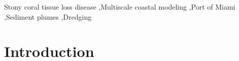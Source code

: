 \documentclass[preprint,12pt,authoryear]{elsarticle}
\begin{document}
\begin{frontmatter}

    \begin{keyword}
        Stony coral tissue loss disease \sep Multiscale coastal modeling \sep Port of Miami \sep Sediment plumes \sep Dredging



    \end{keyword}

\end{frontmatter}

\linenumbers

\section{Introduction}
\end{document}
